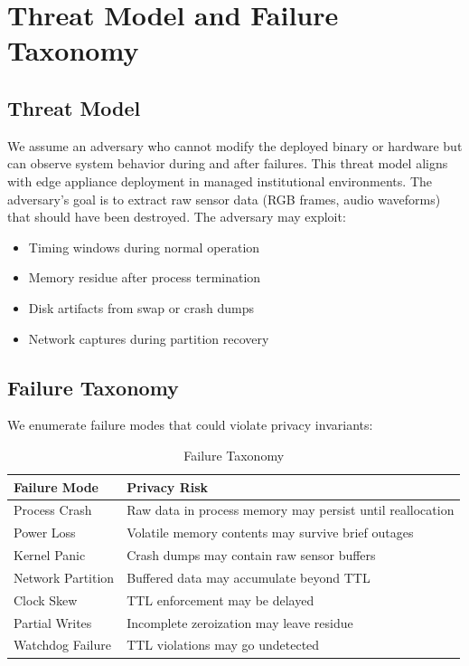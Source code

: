 \documentclass[conference]{IEEEtran}
\begin{document}
\section{Threat Model and Failure Taxonomy}

\subsection{Threat Model}
We assume an adversary who cannot modify the deployed binary or hardware but can observe system behavior during and after failures. This threat model aligns with edge appliance deployment in managed institutional environments. The adversary's goal is to extract raw sensor data (RGB frames, audio waveforms) that should have been destroyed. The adversary may exploit:
\begin{itemize}
    \item Timing windows during normal operation
    \item Memory residue after process termination
    \item Disk artifacts from swap or crash dumps
    \item Network captures during partition recovery
\end{itemize}

\subsection{Failure Taxonomy}
We enumerate failure modes that could violate privacy invariants:

\begin{table}[h]
\caption{Failure Taxonomy}
\centering
\begin{tabular}{p{2.5cm} p{5cm}}
\toprule
\textbf{Failure Mode} & \textbf{Privacy Risk} \\
\midrule
Process Crash & Raw data in process memory may persist until reallocation \\
Power Loss & Volatile memory contents may survive brief outages \\
Kernel Panic & Crash dumps may contain raw sensor buffers \\
Network Partition & Buffered data may accumulate beyond TTL \\
Clock Skew & TTL enforcement may be delayed \\
Partial Writes & Incomplete zeroization may leave residue \\
Watchdog Failure & TTL violations may go undetected \\
\bottomrule
\end{tabular}
\label{tab:failure}
\end{table}
\end{document}
